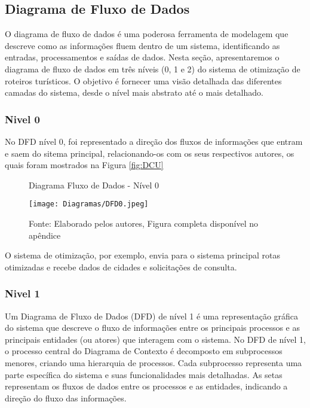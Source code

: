 \subsection{Diagrama de Fluxo de Dados}

O diagrama de fluxo de dados é uma poderosa ferramenta de modelagem que descreve como as informações fluem dentro de um sistema, identificando as entradas, processamentos e saídas de dados. Nesta seção, apresentaremos o diagrama de fluxo de dados em três níveis (0, 1 e 2) do sistema de otimização de roteiros turísticos. O objetivo é fornecer uma visão detalhada das diferentes camadas do sistema, desde o nível mais abstrato até o mais detalhado.

\subsubsection{Nivel 0}

No DFD nível 0, foi representado a direção dos fluxos de informações que entram e saem do sitema principal, relacionando-os com os seus respectivos autores, os quais foram mostrados na Figura \ref{fig:DCU} 
\begin{figure}[H]
    \centering
    \caption{Diagrama Fluxo de Dados - Nível 0}
    \label{fig:DFD0}
    \texttt{[image: Diagramas/DFD0.jpeg]}\\
    \caption*{Fonte: Elaborado pelos autores, Figura completa disponível no apêndice}
\end{figure}

O sistema de otimização, por exemplo, envia para o sistema principal rotas otimizadas e recebe dados de cidades e solicitações de consulta. 


\subsubsection{Nivel 1}

Um Diagrama de Fluxo de Dados (DFD) de nível 1 é uma representação gráfica do sistema que descreve o fluxo de informações entre os principais processos e as principais entidades (ou atores) que interagem com o sistema.
No DFD de nível 1, o processo central do Diagrama de Contexto é decomposto em subprocessos menores, criando uma hierarquia de processos. Cada subprocesso representa uma parte específica do sistema e suas funcionalidades mais detalhadas. As setas representam os fluxos de dados entre os processos e as entidades, indicando a direção do fluxo das informações.

